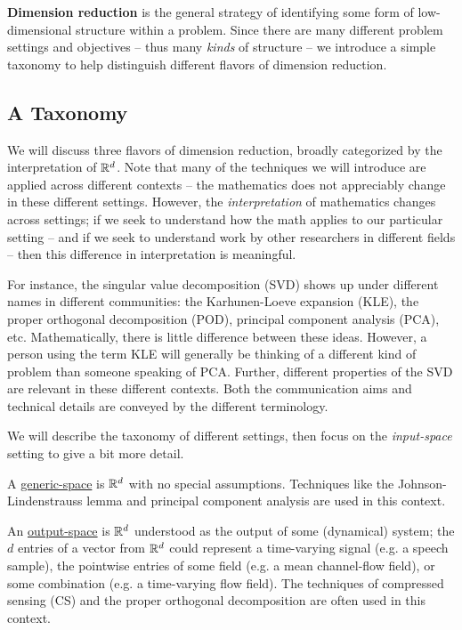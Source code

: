\documentclass{article}
\begin{document}
\textbf{Dimension reduction} is the general strategy of identifying some form of
low-dimensional structure within a problem. Since there are many different
problem settings and objectives -- thus many \emph{kinds} of structure -- we
introduce a simple taxonomy to help distinguish different flavors of dimension
reduction.

\subsection{A Taxonomy}
We will discuss three flavors of dimension reduction, broadly categorized by the
interpretation of $\mathbb{R}^{d}$. Note that many of the techniques we will introduce
are applied across different contexts -- the mathematics does not appreciably
change in these different settings. However, the \emph{interpretation} of
mathematics changes across settings; if we seek to understand how the math
applies to our particular setting -- and if we seek to understand work by other
researchers in different fields -- then this difference in interpretation is
meaningful.

For instance, the singular value decomposition (SVD) shows up under different
names in different communities: the Karhunen-Loeve expansion (KLE), the proper
orthogonal decomposition (POD), principal component analysis (PCA), etc.
Mathematically, there is little difference between these ideas. However, a
person using the term KLE will generally be thinking of a different kind of
problem than someone speaking of PCA. Further, different properties of the SVD
are relevant in these different contexts. Both the communication aims and
technical details are conveyed by the different terminology.

We will describe the taxonomy of different settings, then focus on the
\emph{input-space} setting to give a bit more detail.

\bigskip\noindent A \underline{generic-space} is $\mathbb{R}^{d}$ with no special
assumptions. Techniques like the Johnson-Lindenstrauss lemma and principal
component analysis\cite{fodor2002survey} are used in this context.

\bigskip\noindent An \underline{output-space} is $\mathbb{R}^{d}$ understood as the
output of some (dynamical) system; the $d$ entries of a vector from $\mathbb{R}^{d}$
could represent a time-varying signal (e.g. a speech sample), the pointwise
entries of some field (e.g. a mean channel-flow field), or some combination
(e.g. a time-varying flow field). The techniques of compressed sensing
(CS)\cite{candes2008introduction} and the proper orthogonal
decomposition\cite{lumley2007} are often used in this context.
\end{document}
